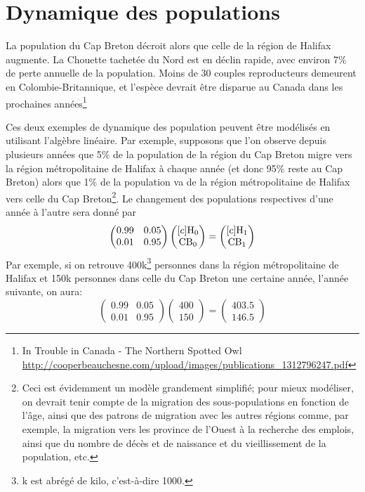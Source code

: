 \section{Dynamique des populations}

La population du Cap Breton décroit alors que celle de la région de Halifax augmente. 
La Chouette tachetée du Nord est en déclin rapide, avec environ 7\% de perte annuelle de la population. 
Moins de 30 couples reproducteurs demeurent en Colombie-Britannique, 
et l'espèce devrait être disparue au Canada dans les prochaines années\footnote{In Trouble in Canada - 
The Northern Spotted Owl \url{http://cooperbeauchesne.com/upload/images/publications_1312796247.pdf}} 

Ces deux exemples de dynamique des population peuvent être modélisés en utilisant l'algèbre linéaire. 
Par exemple, supposons que l'on observe depuis plusieurs années que 5\% de la population de la région 
du Cap Breton migre vers la région métropolitaine de Halifax à chaque année (et donc 95\% reste au Cap Breton)
alors que 1\% de la population
va de la région métropolitaine de Halifax vers celle du Cap Breton\footnote{Ceci est évidemment un
modèle grandement simplifié; pour mieux modéliser, on devrait tenir compte de la migration des
sous-populations en fonction de l'âge, ainsi que des patrons de migration avec les autres régions
comme, par exemple, la migration vers les province de l'Ouest à la recherche des emplois, ainsi que
du nombre de décès et de naissance et du vieillissement de la population, etc.}. 
Le changement des populations respectives d'une année à l'autre sera donné par
\[
\begin{pmatrix}
0.99 & 0.05 \\
0.01 & 0.95
\end{pmatrix}
\begin{pmatrix}[c]
\cf{H}_0 \\
\cf{CB}_0
\end{pmatrix}
=
\begin{pmatrix}[c]
\cf{H}_1 \\
\cf{CB}_1
\end{pmatrix}
\]
Par exemple, si on retrouve
400k\footnote{k est abrégé de kilo, c'est-à-dire 1000.} personnes dans la région 
métropolitaine de Halifax et 150k personnes dans celle du Cap Breton une certaine année,
l'année suivante, on aura:
\[
\begin{pmatrix}
0.99 & 0.05 \\
0.01 & 0.95
\end{pmatrix}
\begin{pmatrix}
400 \\
150
\end{pmatrix}
=
\begin{pmatrix}
403.5 \\
146.5
\end{pmatrix}
\]
